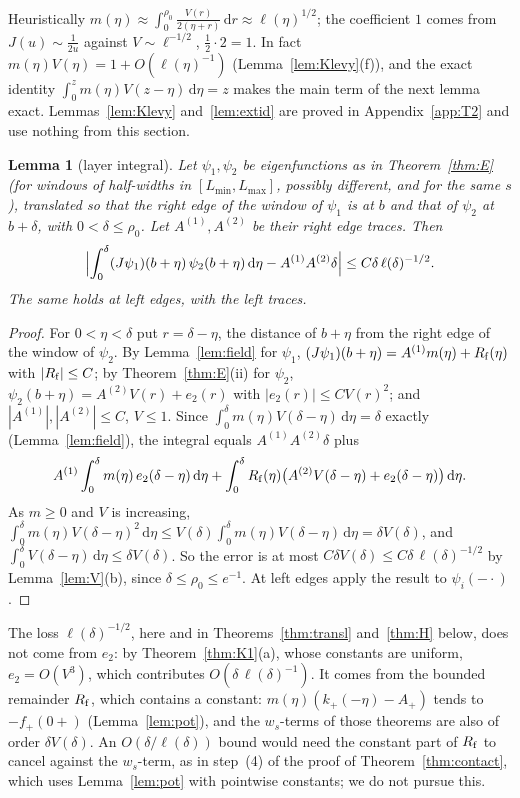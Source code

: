 \documentclass[11pt]{amsart}
\newcommand{\dd}{\,\mathrm{d}}
\newtheorem{lemma}[theorem]{Lemma}
\theoremstyle{definition}
\theoremstyle{remark}
\numberwithin{equation}{section}
\begin{document}
Heuristically $m(\eta)\approx\int_0^{\rho_0}\frac{V(r)}{2(\eta+r)}\dd r\approx\ell(\eta)^{1/2}$; the coefficient $1$ comes from $J(u)\sim\frac1{2u}$ against $V\sim\ell^{-1/2}$, $\frac12\cdot2=1$. In fact $m(\eta)V(\eta)=1+O(\ell(\eta)^{-1})$ (Lemma~\ref{lem:Klevy}(f)), and the exact identity $\int_0^zm(\eta)V(z-\eta)\dd\eta=z$ makes the main term of the next lemma exact. Lemmas~\ref{lem:Klevy} and~\ref{lem:extid} are proved in Appendix~\ref{app:T2} and use nothing from this section.

\begin{lemma}[layer integral]\label{lem:layer}
Let $\psi_1,\psi_2$ be eigenfunctions as in Theorem~\ref{thm:E} (for windows of half-widths in $[L_{\min},L_{\max}]$, possibly different, and for the same $s$), translated so that the right edge of the window of $\psi_1$ is at $b$ and that of $\psi_2$ at $b+\delta$, with $0<\delta\le\rho_0$. Let $A^{(1)},A^{(2)}$ be their right edge traces. Then
\[
\Bigl|\int_0^\delta(J\psi_1)(b+\eta)\,\psi_2(b+\eta)\dd\eta-A^{(1)}A^{(2)}\delta\Bigr|\le C\delta\,\ell(\delta)^{-1/2}.
\]
The same holds at left edges, with the left traces.
\end{lemma}

\begin{proof}
For $0<\eta<\delta$ put $r=\delta-\eta$, the distance of $b+\eta$ from the right edge of the window of $\psi_2$. By Lemma~\ref{lem:field} for $\psi_1$, $(J\psi_1)(b+\eta)=A^{(1)}m(\eta)+R_{\rm f}(\eta)$ with $|R_{\rm f}|\le C$; by Theorem~\ref{thm:E}(ii) for $\psi_2$, $\psi_2(b+\eta)=A^{(2)}V(r)+e_2(r)$ with $|e_2(r)|\le CV(r)^2$; and $|A^{(1)}|,|A^{(2)}|\le C$, $V\le1$. Since $\int_0^\delta m(\eta)V(\delta-\eta)\dd\eta=\delta$ exactly (Lemma~\ref{lem:field}), the integral equals $A^{(1)}A^{(2)}\delta$ plus
\[
A^{(1)}\int_0^\delta m(\eta)\,e_2(\delta-\eta)\dd\eta+\int_0^\delta R_{\rm f}(\eta)\bigl(A^{(2)}V(\delta-\eta)+e_2(\delta-\eta)\bigr)\dd\eta .
\]
As $m\ge0$ and $V$ is increasing, $\int_0^\delta m(\eta)V(\delta-\eta)^2\dd\eta\le V(\delta)\int_0^\delta m(\eta)V(\delta-\eta)\dd\eta=\delta V(\delta)$, and $\int_0^\delta V(\delta-\eta)\dd\eta\le\delta V(\delta)$. So the error is at most $C\delta V(\delta)\le C\delta\,\ell(\delta)^{-1/2}$ by Lemma~\ref{lem:V}(b), since $\delta\le\rho_0\le e^{-1}$. At left edges apply the result to $\psi_i(-\cdot)$.
\end{proof}

The loss $\ell(\delta)^{-1/2}$, here and in Theorems~\ref{thm:transl} and~\ref{thm:H} below, does not come from $e_2$: by Theorem~\ref{thm:K1}(a), whose constants are uniform, $e_2=O(V^3)$, which contributes $O(\delta\,\ell(\delta)^{-1})$. It comes from the bounded remainder $R_{\rm f}$, which contains a constant: $m(\eta)(k_+(-\eta)-A_+)$ tends to $-f_+(0+)$ (Lemma~\ref{lem:pot}), and the $w_s$-terms of those theorems are also of order $\delta V(\delta)$. An $O(\delta/\ell(\delta))$ bound would need the constant part of $R_{\rm f}$ to cancel against the $w_s$-term, as in step~(4) of the proof of Theorem~\ref{thm:contact}, which uses Lemma~\ref{lem:pot} with pointwise constants; we do not pursue this.
\end{document}
